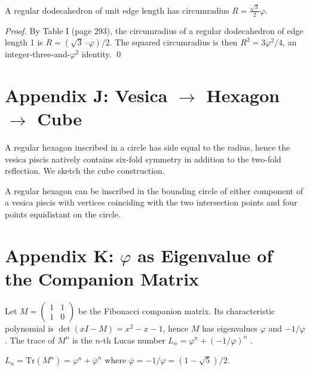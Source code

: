 \begin{theorem}\label{thm:01-dodec-circ}
A regular dodecahedron of unit edge length has circumradius
$R = \frac{\sqrt 3}{2} \varphi$.
\end{theorem}

\begin{proof}
By \cite{coxeter_regular_polytopes} Table I (page 293), the
circumradius of a regular dodecahedron of edge length 1 is
$R = (\sqrt 3 \cdot \varphi)/2$. The squared circumradius is then
$R^2 = 3 \varphi^2 /4$, an integer-three-and-$\varphi^2$ identity.
\qed
\end{proof}

\section*{Appendix J: Vesica $\to$ Hexagon $\to$ Cube}
\label{sec:01-app-J}

A regular hexagon inscribed in a circle has side equal to the
radius, hence the vesica piscis natively contains six-fold symmetry
in addition to the two-fold reflection. We sketch the cube
construction.

\begin{lemma}\label{lem:01-hex-vesica}
A regular hexagon can be inscribed in the bounding circle of either
component of a vesica piscis with vertices coinciding with the two
intersection points and four points equidistant on the circle.
\end{lemma}

\section*{Appendix K: $\varphi$ as Eigenvalue of the Companion Matrix}
\label{sec:01-app-K}

Let $M = \begin{pmatrix} 1 & 1 \\ 1 & 0 \end{pmatrix}$ be the
Fibonacci companion matrix. Its characteristic polynomial is
$\det(xI - M) = x^2 - x - 1$, hence $M$ has eigenvalues $\varphi$ and
$-1/\varphi$. The trace of $M^n$ is the $n$-th Lucas number $L_n =
\varphi^n + (-1/\varphi)^n$ \cite{koshy_fib_lucas}.

\begin{theorem}\label{thm:01-lucas-as-trace}
$L_n = \mathrm{Tr}(M^n) = \varphi^n + \overline{\varphi}^n$ where
$\overline{\varphi} = -1/\varphi = (1 - \sqrt 5)/2$.
\end{theorem}

